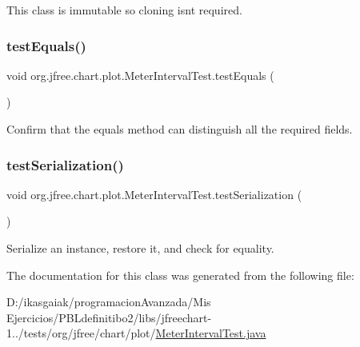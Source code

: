 This class is immutable so cloning isn\textquotesingle{}t required. \mbox{\label{classorg_1_1jfree_1_1chart_1_1plot_1_1_meter_interval_test_a737fe663c8cdd34e9678581142e0892e}} 
\subsubsection{\texorpdfstring{test\+Equals()}{testEquals()}}
{\footnotesize\ttfamily void org.\+jfree.\+chart.\+plot.\+Meter\+Interval\+Test.\+test\+Equals (\begin{DoxyParamCaption}{ }\end{DoxyParamCaption})}

Confirm that the equals method can distinguish all the required fields. \mbox{\label{classorg_1_1jfree_1_1chart_1_1plot_1_1_meter_interval_test_a76730ac1d6ae3d0cb8fee82852246d53}} 
\subsubsection{\texorpdfstring{test\+Serialization()}{testSerialization()}}
{\footnotesize\ttfamily void org.\+jfree.\+chart.\+plot.\+Meter\+Interval\+Test.\+test\+Serialization (\begin{DoxyParamCaption}{ }\end{DoxyParamCaption})}

Serialize an instance, restore it, and check for equality. 

The documentation for this class was generated from the following file\+:\begin{DoxyCompactItemize}
\item 
D\+:/ikasgaiak/programacion\+Avanzada/\+Mis Ejercicios/\+P\+B\+Ldefinitibo2/libs/jfreechart-\/1../tests/org/jfree/chart/plot/\mbox{\hyperlink{_meter_interval_test_8java}{Meter\+Interval\+Test.\+java}}\end{DoxyCompactItemize}
